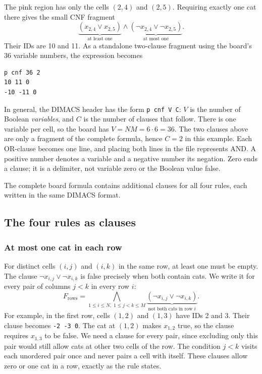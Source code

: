 The pink region has only the cells $(2,4)$ and $(2,5)$. Requiring exactly one cat there gives the small CNF fragment
\[
\underbrace{(x_{2,4}\lor x_{2,5})}_{\text{at least one}}
\land
\underbrace{(\neg x_{2,4}\lor\neg x_{2,5})}_{\text{at most one}}.
\]
Their IDs are 10 and 11. As a standalone two-clause fragment using the board's 36 variable numbers, the expression becomes
\begin{verbatim}
p cnf 36 2
10 11 0
-10 -11 0
\end{verbatim}
In general, the DIMACS header has the form \texttt{p cnf V C}: $V$ is the number of Boolean \emph{variables}, and $C$ is the number of clauses that follow. There is one variable per cell, so the board has $V=NM=6\cdot6=36$. The two clauses above are only a fragment of the complete formula, hence $C=2$ in this example. Each OR-clause becomes one line, and placing both lines in the file represents AND. A positive number denotes a variable and a negative number its negation. Zero ends a clause; it is a delimiter, not variable zero or the Boolean value false.

The complete board formula contains additional clauses for all four rules, each written in the same DIMACS format.

\subsection{The four rules as clauses}

\subsubsection{At most one cat in each row}

For distinct cells $(i,j)$ and $(i,k)$ in the same row, at least one must be empty. The clause $\neg x_{i,j}\lor\neg x_{i,k}$ is false precisely when both contain cats. We write it for every pair of columns $j<k$ in every row $i$:
\[
F_{\mathrm{rows}}=
\bigwedge_{1\le i\le N,\;1\le j<k\le M}
\underbrace{(\neg x_{i,j}\lor\neg x_{i,k})}_{\text{not both cats in row }i}.
\]
For example, in the first row, cells $(1,2)$ and $(1,3)$ have IDs 2 and 3. Their clause becomes \texttt{-2 -3 0}. The cat at $(1,2)$ makes $x_{1,2}$ true, so the clause requires $x_{1,3}$ to be false. We need a clause for every pair, since excluding only this pair would still allow cats at other two cells of the row. The condition $j<k$ visits each unordered pair once and never pairs a cell with itself. These clauses allow zero or one cat in a row, exactly as the rule states.

